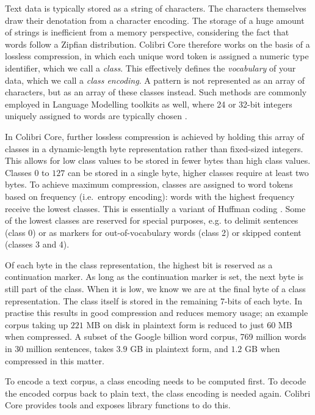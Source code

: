 \documentclass[a4paper,12pt]{article}
\begin{document}
Text data is typically stored as a string of characters. The characters
themselves draw their denotation from a character encoding. The storage of a
huge amount of strings is inefficient from a memory perspective, considering
the fact that words follow a Zipfian distribution. Colibri Core therefore works
on the basis of a lossless compression, in which each unique word token is
assigned a numeric type identifier, which we call a \emph{class}. This
effectively defines the \emph{vocabulary} of your data, which we call a
\emph{class encoding}. A pattern is not represented as an array of
characters, but as an array of these classes instead. Such methods are commonly
employed in Language Modelling toolkits as well, where 24 or 32-bit integers
uniquely assigned to words are typically chosen \cite{Guthrie2010}.

In Colibri Core, further lossless compression is achieved by holding this array of
classes in a dynamic-length byte representation rather than fixed-sized
integers. This allows  for low class values to be stored in fewer bytes than
high class values. Classes $0$ to $127$ can be stored in a single byte, higher
classes require at least two bytes. To achieve maximum compression, classes are
assigned to word tokens based on frequency (i.e.\ entropy encoding): words with
the highest frequency receive the lowest classes.  This is essentially a
variant of Huffman coding \citep{HUFFMAN}. Some of the lowest classes are
reserved for special purposes, e.g. to delimit sentences (class 0) or as
markers for out-of-vocabulary words (class 2) or skipped content (classes 3 and
4).

Of each byte in the class representation, the highest bit is reserved as a continuation
marker. As long as the continuation marker is set, the next byte is still part of
the class. When it is low, we know we are at the final byte of a class
representation. The class itself is stored in the remaining 7-bits of each
byte. In practise this results in good compression and reduces memory usage; an
example corpus taking up $221$ MB on disk in plaintext form is reduced to just $60$ MB
when compressed. A subset of the Google billion word corpus, 769 million words
in 30 million sentences, takes $3.9$ GB in plaintext form, and $1.2$ GB when
compressed in this matter.

To encode a text corpus, a class encoding needs to be computed first. To decode
the encoded corpus back to plain text, the class encoding is needed again.
Colibri Core provides tools and exposes library functions to do this.
\end{document}
